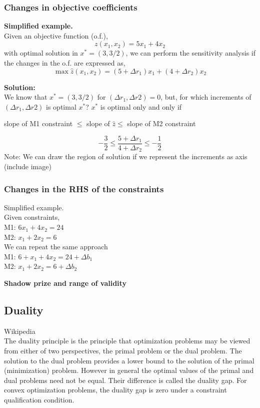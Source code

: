 \subsubsection{Changes in objective coefficients}
\textbf{Simplified example.}\\
Given an objective function (o.f.),
\[ z(x_1, x_2) = 5x_1 + 4x_2 \]
with optimal solution in $x^* = (3, 3/2)$, we can perform the sensitivity analysis if the changes in the o.f. are expressed as,
\[ \max \hat{z}(x_1, x_2) = (5+\Delta r_1)x_1 + (4 + \Delta r_2)x_2 \]

\textbf{Solution:}\\
We know that $x^* = (3, 3/2)$ for $(\Delta r_1, \Delta r2) = 0$, but, for which increments of $(\Delta r_1, \Delta r2)$ is optimal $x^*$?
$x^*$ is optimal only and only if
\begin{center}
    slope of M1 constraint $\leq$ slope of $\hat{z} \leq$ slope of M2 constraint
\end{center} 
\[ -\frac{3}{2} \leq \frac{5 + \Delta r_1}{4 + \Delta r_2} \leq -\frac{1}{2} \]
Note: We can draw the region of solution if we represent the increments as axis (include image)

\subsubsection{Changes in the RHS of the constraints}
Simplified example.\\
Given constraints,\\
M1: $ 6x_1 + 4x_2 = 24 $ \\
M2: $ x_1 + 2x_2 = 6 $\\
We can repeat the same approach\\
M1: $ 6+x_1 + 4x_2 = 24 + \Delta b_1 $\\
M2: $ x_1 + 2x_2 = 6 + \Delta b_2 $

\textbf{Shadow prize and range of validity}

\subsection{Duality}
Wikipedia\\
The duality principle is the principle that optimization problems may be viewed from either of two perspectives, the primal problem or the dual problem. 
The solution to the dual problem provides a lower bound to the solution of the primal (minimization) problem. However in general the optimal values of 
the primal and dual problems need not be equal. Their difference is called the duality gap. For convex optimization problems, the duality gap is zero under 
a constraint qualification condition. \\

